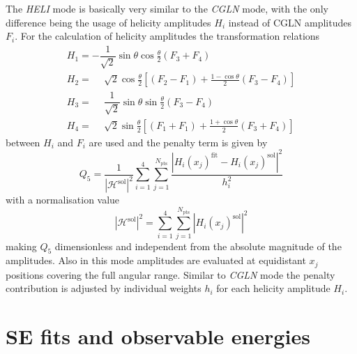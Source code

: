 \documentclass[a4paper,10pt]{article}
\begin{document}
The \textit{HELI} mode is basically very similar to the \textit{CGLN} mode, with the only difference being the
usage of helicity amplitudes $H_i$ instead of CGLN amplitudes $F_i$. For the calculation of helicity amplitudes
the transformation relations
\begin{displaymath}\label{frm_Heli}
\begin{array}{l}
H_1 =           -\dfrac{1}{\sqrt{2}}\sin\theta\cos\frac{\theta}{2} \left(F_3 + F_4\right) \\
H_2 = \phantom{-}\sqrt{2}\cos\frac{\theta}{2}\left[\left(F_2 - F_1\right) + \frac{1-\cos\theta}{2}\left(F_3 - F_4\right)\right] \\
H_3 = \phantom{-}\dfrac{1}{\sqrt{2}}\sin\theta\sin\frac{\theta}{2} \left(F_3 - F_4\right) \\
H_4 = \phantom{-}\sqrt{2}\sin\frac{\theta}{2}\left[\left(F_1 + F_1\right) + \frac{1+\cos\theta}{2}\left(F_3 + F_4\right)\right]
\end{array}
\end{displaymath}
between $H_i$ and $F_i$ are used and the penalty term is given by
\begin{displaymath}
 Q_5 =\frac{1}{|\mathcal{H}^\mathrm{sol}|^2}
\sum_{i=1}^4
\sum_{j=1}^{N_\mathrm{pts}}
\frac{|H_i(x_j)^\mathrm{fit} - H_i(x_j)^\mathrm{sol}|^2}{h_i^2}
\end{displaymath}
with a normalisation value
\begin{displaymath}
 |\mathcal{H}^\mathrm{sol}|^2 = \sum_{i=1}^4\sum_{j=1}^{N_\mathrm{pts}} |H_i(x_j)^\mathrm{sol}|^2
\end{displaymath}
making $Q_5$ dimensionless and independent from the absolute magnitude of the amplitudes. Also in this mode amplitudes
are evaluated at equidistant $x_j$ positions covering the full angular range. Similar to \textit{CGLN} mode
the penalty contribution is adjusted by individual weights $h_i$ for each helicity amplitude $H_i$.

\section{SE fits and observable energies}
\end{document}
